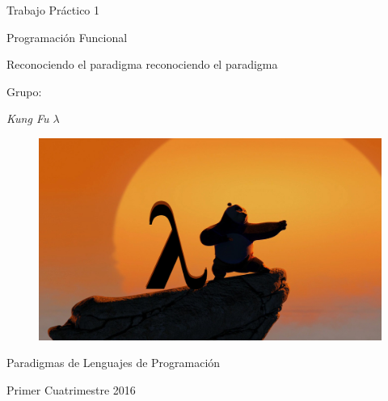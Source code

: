 \documentclass[a4paper]{article}
\begin{document}
\pagestyle{empty}
\begin{center}

\vspace*{1cm}

\begin{Huge}
Trabajo Práctico 1

Programación Funcional
\end{Huge}

\begin{large}
\vspace*{0.5cm}

Reconociendo el paradigma reconociendo el paradigma

\vspace*{1.5cm}
\end{large}

\begin{Large}
Grupo:

\vspace*{0.3cm}
\end{Large}

\begin{Huge}
{\it Kung Fu $\lambda$}
\end{Huge}

\begin{figure}[!htb]
  \includegraphics[scale=0.25]{LambdaPoKungFuPose.jpg}
\end{figure}

\vspace*{3cm}

\begin{large}
Paradigmas de Lenguajes de Programación

Primer Cuatrimestre 2016
\end{large}

\end{center}
\end{document}
